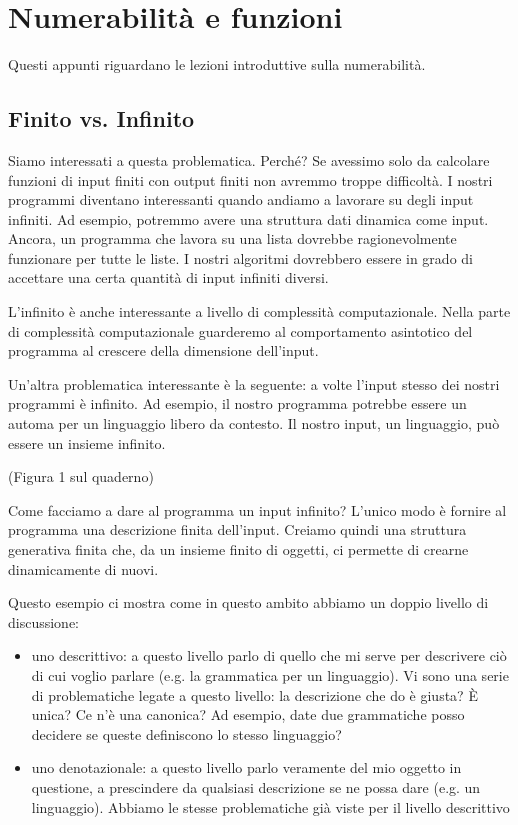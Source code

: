 \chapter{Numerabilità e funzioni}

Questi appunti riguardano le lezioni introduttive sulla numerabilità.


\section{Finito vs. Infinito}

Siamo interessati a questa problematica. Perché? Se avessimo solo da calcolare funzioni di input
finiti con output finiti non avremmo troppe difficoltà. I nostri programmi diventano interessanti
quando andiamo a lavorare su degli input infiniti. Ad esempio, potremmo avere una struttura dati
dinamica come input. Ancora, un programma che lavora su una lista dovrebbe ragionevolmente
funzionare per tutte le liste. I nostri algoritmi dovrebbero essere in grado di accettare una
certa quantità di input infiniti diversi.

L'infinito è anche interessante a livello di complessità computazionale. Nella parte di
complessità computazionale guarderemo al comportamento asintotico del programma al crescere della
dimensione dell'input.

Un'altra problematica interessante è la seguente: a volte l'input stesso dei nostri programmi è
infinito.  Ad esempio, il nostro programma potrebbe essere un automa per un linguaggio libero da
contesto. Il nostro input, un linguaggio, può essere un insieme infinito. 

(Figura 1 sul quaderno)

Come facciamo a dare al programma un input infinito? L'unico modo è fornire al programma una
descrizione finita dell'input. Creiamo quindi una struttura generativa finita che, da un insieme
finito di oggetti, ci permette di crearne dinamicamente di nuovi.

Questo esempio ci mostra come in questo ambito abbiamo un doppio livello di discussione:
\begin{itemize}

    \item uno descrittivo: a questo livello parlo di quello che mi serve per descrivere ciò di cui
    voglio parlare (e.g. la grammatica per un linguaggio). Vi sono una serie di problematiche legate
    a questo livello: la descrizione che do è giusta? È unica? Ce n'è una canonica? Ad esempio,
    date due grammatiche posso decidere se queste definiscono lo stesso linguaggio?

    \item uno denotazionale: a questo livello parlo veramente del mio oggetto in questione, a
    prescindere da qualsiasi descrizione se ne possa dare (e.g. un linguaggio). Abbiamo le stesse
    problematiche già viste per il livello descrittivo 

\end{itemize}

